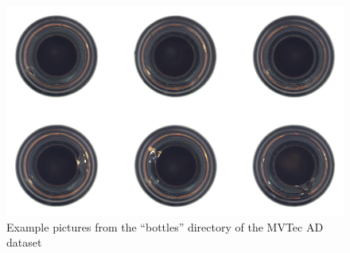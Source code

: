 \begin{figure}[H]
    \centering
    \includegraphics[scale=0.55]{src/images/dataset_example.png}
    \caption{Example pictures from the ``bottles'' directory of the MVTec AD dataset}
    \label{fig:dataset_example}
\end{figure}